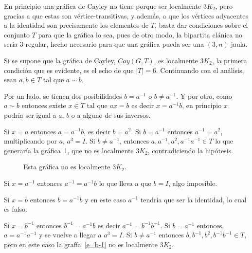 \documentclass[12pt]{book}
\theoremstyle{definition}
\begin{document}
En principio una gráfica de Cayley no tiene porque ser localmente
$3K_2$, pero gracias a que estas son vértice-transitivas, y además, a
que los vértices adyacentes a la identidad son precisamente los
elementos de $T$, basta dar condiciones sobre el conjunto $T$ para que
la gráfica lo sea, pues de otro modo, la bipartita clánica no seria
$3$-regular, hecho necesario para que una gráfica pueda ser una
$(3,n)$-jaula.



Si se supone que la gráfica de Cayley, $Cay(G, T)$, es localmente
$3K_2$, la primera condición que es evidente, es el echo de que
$|T|=6$. Continuando con el análisis, sean $a, b \in T$ tal que $a
\sim b$.

Por un lado, se tienen dos posibilidades $b= a^{-1}$ o $b\neq
a^{-1}$. Y por otro, como $a\sim b$ entonces existe $x\in T$ tal que
$ax=b$ es decir $x=a^{-1}b$, en principio $x$ podría ser igual a $a$,
$b$ o a alguno de sus inversos.


Si $x=a$ entonces $a=a^{-1}b$, es decir $b=a^2$. Si $b=a^{-1}$
entonces $a^{-1}=a^2$, multiplicando por $a$, $a^3= I$. Si $b \neq
a^{-1}$, entonces $ a, a^{-1}, a^2, a^{-1}a^{-1} \in T$ lo que
generaría la gráfica~\ref{e=a}, que no es localmente $3K_2$,
contradiciendo la hipótesis.



\begin{figure}
  \centering
  \caption{Esta gráfica no es localmente $3K_2$.}\label{e=a}
\end{figure}


Si $x=a^{-1}$ entonces $a^{-1}=a^{-1}b$ lo que lleva a que $b=I$, algo
imposible.


Si $x=b$ entonces $b=a^{-1}b$ y en este caso $a^{-1}$ tendría que ser
la identidad, lo cual es falso.


Si $x=b^{-1}$ entonces $b^{-1}=a^{-1}b$ es decir
$a^{-1}=b^{-1}b^{-1}$. Si $b=a^{-1}$ entonces, $a=a^{-1}a^{-1}$ y se
vuelve a llegar a $a^3=I$. Si $ b\neq a^{-1}$ entonces $b, b^{-1},
b^2, b^{-1}b^{-1}\in T$, pero en este caso la grafía~\ref{e=b-1} no es
localmente $3K_2$.
\end{document}
